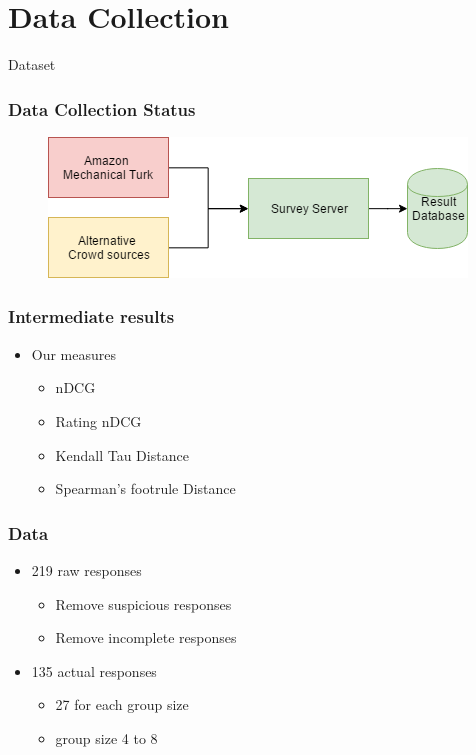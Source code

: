 \section{Data Collection}

\begin{frame}
     \begin{center}
     	\huge Dataset
     \end{center}
\end{frame}

\begin{frame}
\frametitle{Data Collection Status}
\begin{figure}
	\centering
	\includegraphics[scale=.5]{graphics/surveystatus.png}
\end{figure}
\end{frame}

\begin{frame}
\frametitle{Intermediate results}
\begin{itemize}
	\item Our measures
	\begin{itemize}
		\item nDCG
		\item Rating nDCG
		\item Kendall Tau Distance
		\item Spearman's footrule Distance
	\end{itemize}
\end{itemize}
\end{frame}

\begin{frame}
\frametitle{Data}
\begin{itemize}
	\item 219 raw responses
	\begin{itemize}
		\item Remove suspicious responses
		\item Remove incomplete responses
	\end{itemize}
	\item 135 actual responses
	\begin{itemize}
		\item 27 for each group size
		\item group size 4 to 8
	\end{itemize}
\end{itemize}
\end{frame}

